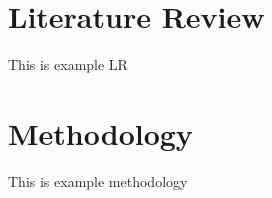 \documentclass[conference]{IEEEtran}
\begin{document}
\section{Literature Review}

This is example LR \cite{molnar2011educamovil}

\section{Methodology}

This is example methodology\cite{molnar2011educamovil}


 






\end{document}
